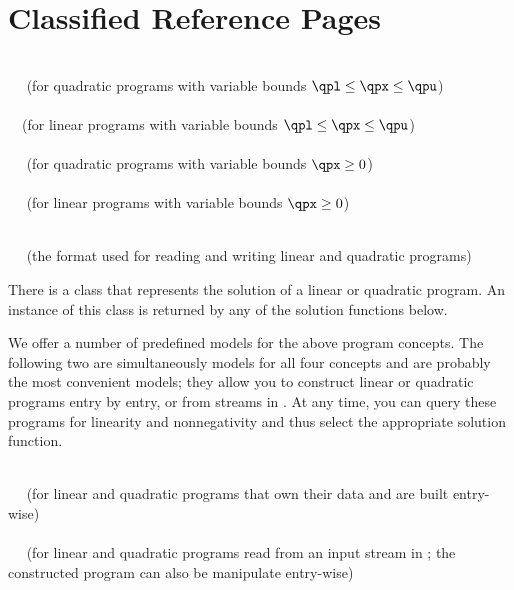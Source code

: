 
\section{Classified Reference Pages}

\\
$\quad$ (for quadratic programs with variable bounds $\qpl\leq \qpx \leq \qpu$) \\
 \\
$\quad$(for linear programs with variable bounds $\qpl\leq \qpx \leq \qpu$)\\
\\
$\quad$ (for quadratic programs with variable bounds $\qpx\geq 0$) \\
\\
$\quad$ (for linear programs with variable bounds $\qpx\geq 0$)

\\
$\quad$ (the format used for reading and writing linear and quadratic 
programs)


There is a class that represents the solution of a linear
or quadratic program. An instance of this class is returned by any of 
the solution functions below.


We offer a number of predefined models for the above program concepts.
The following two are simultaneously models for all four concepts and
are probably the most convenient models; they allow you to construct
linear or quadratic programs entry by entry, or from streams in
. At any time, you can query these programs for
linearity and nonnegativity and thus select the appropriate 
solution function.

\\
$\quad$ (for linear and quadratic programs that own their 
data and are built entry-wise)\\
\\
$\quad$ (for linear and quadratic programs read from an input stream in 
; the constructed program can also be manipulate entry-wise)

